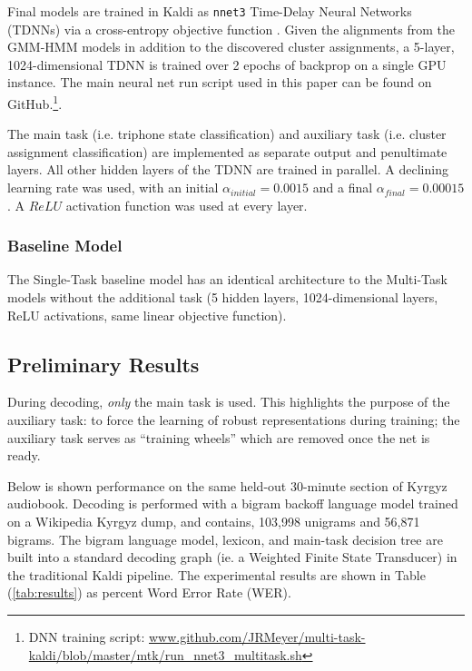 \documentclass[a4paper]{article}
\begin{document}
Final models are trained in Kaldi as \texttt{nnet3} Time-Delay Neural Networks (TDNNs) via a cross-entropy objective function \cite{povey2011,peddinti2015}. Given the alignments from the GMM-HMM models in addition to the discovered cluster assignments, a 5-layer, 1024-dimensional TDNN is trained over 2 epochs of backprop on a single GPU instance. The main neural net run script used in this paper can be found on GitHub.\footnote{DNN training script: \url{www.github.com/JRMeyer/multi-task-kaldi/blob/master/mtk/run_nnet3_multitask.sh}}.

The main task (i.e. triphone state classification) and auxiliary task (i.e. cluster assignment classification) are implemented as separate output and penultimate layers. All other hidden layers of the TDNN are trained in parallel. A declining learning rate was used, with an initial $\alpha_{initial}=0.0015$ and a final $\alpha_{final}=0.00015$. A $ReLU$ activation function was used at every layer.


\subsubsection{Baseline Model}

The Single-Task baseline model has an identical architecture to the Multi-Task models without the additional task (5 hidden layers, 1024-dimensional layers, ReLU activations, same linear objective function).



\subsection{Preliminary Results}

 During decoding, \textit{only} the main task is used. This highlights the purpose of the auxiliary task: to force the learning of robust representations during training; the auxiliary task serves as ``training wheels'' which are removed once the net is ready.

Below is shown performance on the same held-out 30-minute section of Kyrgyz audiobook. Decoding is performed with a bigram backoff language model trained on a Wikipedia Kyrgyz dump, and contains, 103,998 unigrams and 56,871 bigrams. The bigram language model, lexicon, and main-task decision tree are built into a standard decoding graph (ie. a Weighted Finite State Transducer) in the traditional Kaldi pipeline. The experimental results are shown in Table (\ref{tab:results}) as percent Word Error Rate (WER).
\end{document}

